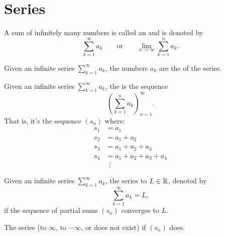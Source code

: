 \chapter{Series}
\begin{definition}
  A sum of infinitely many numbers is called an  and is denoted by
  \[ \sum_{k = 1}^{\infty} a_k \qquad {\text{or}} \qquad \lim_{n \to
  \infty} \sum_{k = 1}^{n} a_k. \]
\end{definition}

\begin{definition}[Terms]
  Given an infinite series $\sum_{k = 1}^{\infty} a_k$, the numbers
  $a_k$ are the  of the series.
\end{definition}

\begin{definition}
  Given an infinite series $\sum_{k = 1}^{\infty} a_k$, the
   is the sequence
  \[ \left(\sum_{k = 1}^{n} a_k\right)_{n = 1}^{\infty}. \]
  That is, it's the sequence $(s_n)$ where:
  \begin{align*}
    s_1 & = a_1 \\
    s_2 & = a_1 + a_2 \\
    s_3 & = a_1 + a_2 + a_3 \\
    s_4 & = a_1 + a_2 + a_3 + a_4 \\
    & \,\,\, \vdots
  \end{align*}
\end{definition}

\begin{definition}
  Given an infinite series $\sum_{k = 1}^{\infty} a_k$, the series
   to $L \in \mathbb R$, denoted by
  \[ \sum_{k = 1}^{\infty} a_k = L, \]
  if the sequence of partial sums $(s_n)$ converges to $L$.

  The series  (to $\infty$, to $-\infty$, or does not
  exist) if $(s_n)$ does.
\end{definition}

